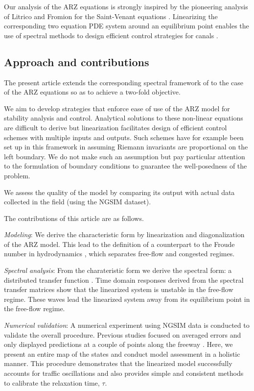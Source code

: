 \documentclass[5p,twocolumn]{elsarticle}
\begin{document}
Our analysis of the ARZ equations is strongly inspired by the pioneering analysis of Litrico and Fromion for the Saint-Venant equations \cite{litrico2009modeling}. Linearizing the corresponding two equation PDE system around an equilibrium point enables the use of spectral methods to design efficient control strategies for canals \cite{Litricoapplic}.

\subsection{Approach and contributions}
The present article extends the corresponding spectral framework of \cite{litrico2009modeling} to the case of the ARZ equations so as to achieve a two-fold objective.

We aim to develop strategies that enforce ease of use of the ARZ model for stability analysis and control. Analytical solutions to these non-linear equations are difficult to derive but linearization facilitates design of efficient control schemes with multiple inputs and outputs. Such schemes have for example been set up in this framework in \cite{lamare2014} assuming Riemann invariants are proportional on the left boundary. We do not make such an assumption but pay particular attention to the formulation of boundary conditions to guarantee the well-posedness of the problem.

We assess the quality of the model by comparing its output with actual data collected in the field (using the NGSIM dataset).

The contributions of this article are as follows.

\textit{Modeling}: We derive the characteristic form by linearization and diagonalization of the ARZ model. This lead to the definition of a counterpart to the Froude number in hydrodynamics \cite{litrico2009modeling}, which separates free-flow and congested regimes.

\textit{Spectral analysis}: From the charateristic form we derive the spectral form: a distributed transfer function \cite{litrico2009modeling}. Time domain responses derived from the spectral transfer matrices show that the linearized system is unstable in the free-flow regime. These waves lead the linearized system away from its equilibrium point in the free-flow regime. 

\textit{Numerical validation}: A numerical experiment using NGSIM data is conducted to validate the overall procedure. Previous studies focused on averaged errors and only displayed predictions at a couple of points along the freeway \cite{GodunovARZ,Fan}. Here, we present an entire map of the states and conduct model assessment in a holistic manner. This procedure demonstrates that the linearized model successfully accounts for traffic oscillations and also provides simple and consistent methods to calibrate the relaxation time, $\tau$.
\end{document}
